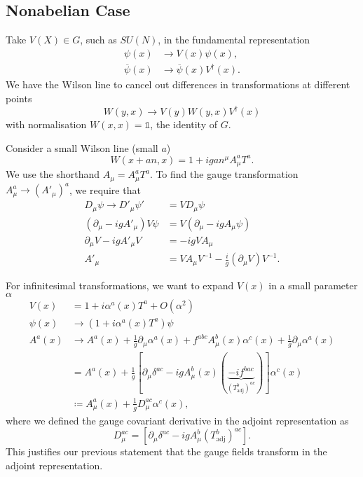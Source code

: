 
\subsection{Nonabelian Case}%
\label{sub:nonabelian_case}

Take $V(X) \in G$, such as $SU(N)$, in the fundamental representation
\begin{align}
  \psi(x) &\to V(x) \psi(x), \\
  \overline{\psi}{}(x) &\to \overline{\psi}{}(x) V^{\dagger}(x).
\end{align}
We have the Wilson line to cancel out differences in transformations at different points
\begin{equation}
  W(y, x) \to V(y) W(y, x) V^{\dagger}(x)
\end{equation}
with normalisation $W(x, x) = \mathbb{1}$, the identity of $G$.

Consider a small Wilson line (small $a$)
\begin{equation}
  W(x + an, x) = 1 + i g a n^{\mu} A_{\mu}^{a} T^{a}.
\end{equation}
We use the shorthand $A_{\mu} = A^{a}_{\mu} T^{a}$.
To find the gauge transformation $A_{\mu}^{a} \to (A'_{\mu})^{a}$, we require that
\begin{align}
  D_{\mu}\psi \to D'_{\mu} \psi' &= V D_{\mu} \psi \\
  (\partial_{\mu} - i g A'_{\mu}) V\psi &= V(\partial_{\mu} - i g A_{\mu} \psi) \\
  \partial_{\mu} V - i g A'_{\mu} V &= -i g V A_{\mu} \\
  A'_{\mu} &= V A_{\mu} V^{-1} - \frac{i}{g} (\partial_{\mu} V) V^{-1}.
\end{align}

For infinitesimal transformations, we want to expand $V(x)$ in a small parameter $\alpha$
\begin{align}
  V(x) &= 1 + i \alpha^{a}(x) T^{a} + O(\alpha^2) \\
  \psi(x) &\to (1 + i \alpha^{a}(x) T^{a})\psi \\
  A^{a}(x) &\to A^a (x) + \frac{1}{g} \partial_{\mu} \alpha^{a}(x) + f^{abc} A_{\mu}^{b} (x) \alpha^{c}(x) + \frac{1}{g} \partial_{\mu} \alpha^{a}(x) \\
	   &= A^{a}(x) +\frac{1}{g} [\partial_{\mu} \delta^{ac} - i g A^{b}_\mu(x) (\underbrace{-i f^{bac}}_{(T^{b}_{\text{adj}})^{ac}})] \alpha^{c}(x) \\
	   &\coloneqq A^{a}_{\mu} (x) + \frac{1}{g} D_{\mu}^{ac} \alpha^{c}(x),
\end{align}
where we defined the gauge covariant derivative in the adjoint representation as 
\begin{equation}
  D_{\mu}^{ac} = \left[ \partial_{\mu} \delta^{ac} - i g A_{\mu}^{b} (T^{b} _{\text{adj}})^{ac} \right].
\end{equation}
This justifies our previous statement that the gauge fields transform in the adjoint representation.

